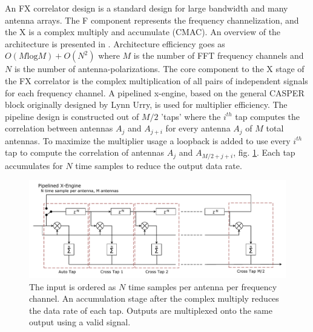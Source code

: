 \documentclass[useAMS,macros,usenatbib,onecolumn]{mn2e}
\begin{document}
An FX correlator design is a standard design for large bandwidth and many antenna arrays.
The F component represents the frequency channelization, and the X is a complex multiply and accumulate (CMAC).
An overview of the architecture is presented in \citep{}.
Architecture efficiency goes as $O( M \textrm{log} M) + O( N^2)$ where $M$ is the number of FFT frequency channels and $N$ is the number of antenna-polarizations.
The core component to the X stage of the FX correlator is the complex multiplication of all pairs of independent signals for each frequency channel.
A pipelined x-engine, based on the general CASPER block originally designed by Lynn Urry\citep{}, is used for multiplier efficiency.
The pipeline design is constructed out of $M/2$ 'taps' where the $i^{th}$ tap computes the correlation between antennas $A_j$ and $A_{j+i}$ for every antenna $A_j$ of $M$ total antennas.
To maximize the multiplier usage a loopback is added to use every $i^{th}$ tap to compute the correlation of antennas $A_j$ and $A_{M/2+j+i}$, fig. \ref{fig:xeng_pipe}.
Each tap accumulates for $N$ time samples to reduce the output data rate.

\begin{figure}
    \centering
    \includegraphics[scale=0.6]{graphics/crop_pipelined_xeng.pdf}
    \caption{The input is ordered as $N$ time samples per antenna per frequency channel. An accumulation stage after the complex multiply reduces the data rate of each tap. Outputs are multiplexed onto the same output using a valid signal.}
    \label{fig:xeng_pipe}
\end{figure}
\end{document}
